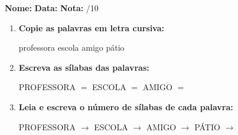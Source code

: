 \begin{exercicio}



\noindent\textbf{Nome:} \underline{\hspace{3.2cm}} \quad \textbf{Data:} \underline{\hspace{1.6cm}} \quad \textbf{Nota:} \underline{\hspace{0.9cm}}/10


\begin{enumerate}

  \item \textbf{Copie as palavras em letra cursiva:}
  \begin{center}
  professora \quad escola \quad amigo \quad pátio
  \end{center}
  \begin{center}
  \underline{\hspace{2.4cm}} \quad \underline{\hspace{2.4cm}} \quad \underline{\hspace{2.4cm}} \quad \underline{\hspace{2.4cm}}
  \end{center}

  \item \textbf{Escreva as sílabas das palavras:}
  \begin{center}
  PROFESSORA $=$ \underline{\hspace{1.5cm}} \underline{\hspace{1.5cm}} \quad ESCOLA $=$ \underline{\hspace{1.5cm}} \underline{\hspace{1.5cm}} \quad AMIGO $=$ \underline{\hspace{1.5cm}} \underline{\hspace{1.5cm}}
  \end{center}

  \item \textbf{Leia e escreva o número de sílabas de cada palavra:}
  \begin{center}
  PROFESSORA $\rightarrow$ \underline{\hspace{0.9cm}} \quad ESCOLA $\rightarrow$ \underline{\hspace{0.9cm}} \quad AMIGO $\rightarrow$ \underline{\hspace{0.9cm}} \quad PÁTIO $\rightarrow$ \underline{\hspace{0.9cm}}
  \end{center}


\end{enumerate}
\end{exercicio}
